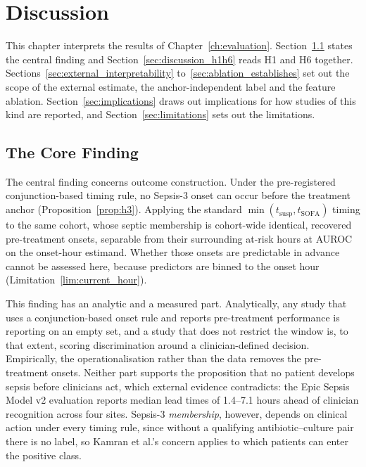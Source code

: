 \chapter{Discussion}
\label{ch:discussion}

This chapter interprets the results of Chapter~\ref{ch:evaluation}.
Section~\ref{sec:discussion_core} states the central finding and
Section~\ref{sec:discussion_h1h6} reads H1 and H6 together.
Sections~\ref{sec:external_interpretability} to~\ref{sec:ablation_establishes}
set out the scope of the external estimate, the anchor-independent label and
the feature ablation. Section~\ref{sec:implications} draws out implications for
how studies of this kind are reported, and Section~\ref{sec:limitations} sets
out the limitations.


\section{The Core Finding}
\label{sec:discussion_core}

The central finding concerns outcome construction. Under the pre-registered
conjunction-based timing rule, no Sepsis-3 onset can occur before the treatment
anchor (Proposition~\ref{prop:h3}). Applying the standard
$\min(t_{\text{susp}}, t_{\text{SOFA}})$ timing to the same cohort, whose
septic membership is cohort-wide identical, recovered \pcPreTreatOnsetsVarF{}
pre-treatment onsets, separable from their surrounding at-risk hours at
\pcPreTreatAurocPrimaryF{} AUROC on the onset-hour estimand. Whether those
onsets are predictable in advance cannot be assessed here, because predictors
are binned to the onset hour (Limitation~\ref{lim:current_hour}).

This finding has an analytic and a measured part. Analytically, any study that
uses a conjunction-based onset rule and reports pre-treatment performance is
reporting on an empty set, and a study that does not restrict the window is,
to that extent, scoring discrimination around a clinician-defined decision.
Empirically, the operationalisation rather than the data removes the
pre-treatment onsets. Neither part supports the proposition that no patient
develops sepsis before clinicians act, which external evidence contradicts:
the Epic Sepsis Model v2 evaluation \cite{wong2026epic} reports median lead
times of 1.4--7.1 hours ahead of clinician recognition across four sites.
Sepsis-3 \emph{membership}, however, depends on clinical action under every
timing rule, since without a qualifying antibiotic--culture pair there is no
label, so Kamran et al.'s \cite{kamran2024evaluation} concern applies to which
patients can enter the positive class.

